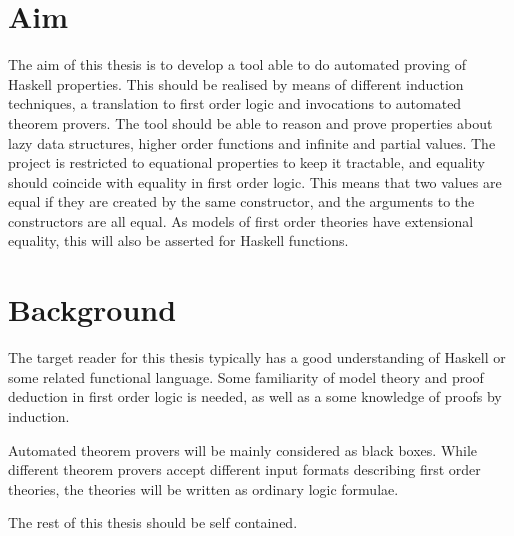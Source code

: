 \section{Aim}

The aim of this thesis is to develop a tool able to do automated
proving of Haskell properties. This should be realised by means of
different induction techniques, a translation to first order logic and
invocations to automated theorem provers. The tool should be able to
reason and prove properties about lazy data structures, higher order
functions and infinite and partial values. The project is restricted
to equational properties to keep it tractable, and equality should
coincide with equality in first order logic. This means that two
values are equal if they are created by the same constructor, and the
arguments to the constructors are all equal. As models of first order
theories have extensional equality, this will also be asserted for
Haskell functions.

\section{Background}

The target reader for this thesis typically has a good understanding
of Haskell or some related functional language. Some familiarity
of model theory and proof deduction in first order logic is
needed, as well as a some knowledge of proofs by induction.

Automated theorem provers will be mainly considered as black
boxes. While different theorem provers accept different input formats
describing first order theories, the theories will be written as
ordinary logic formulae.

The rest of this thesis should be self contained.











































